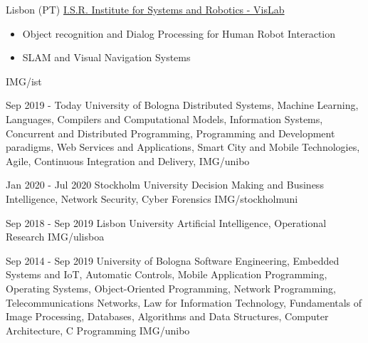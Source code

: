 \documentclass[paper=a4,fontsize=11pt, hidelinks]{temp} %
\begin{document}
{Lisbon (PT) \href{https://welcome.isr.tecnico.ulisboa.pt/}{ I.S.R. Institute for Systems and Robotics - VisLab}}
{
 \begin{itemize}
    \item Object recognition and Dialog Processing for Human Robot Interaction
    \item SLAM and Visual Navigation Systems
 \end{itemize}
} {IMG/ist}

\noindent

{Sep 2019 - Today}
{University of Bologna}
{Distributed Systems, Machine Learning,    Languages, Compilers and Computational Models,    Information Systems,     Concurrent and Distributed Programming,    Programming and Development paradigms,    Web Services and Applications,     Smart City and Mobile Technologies,     Agile, Continuous Integration and Delivery,  } 
{IMG/unibo}


\sepspace

{Jan 2020 - Jul 2020}
{Stockholm University}
{Decision Making and Business Intelligence, Network Security, Cyber Forensics}
{IMG/stockholmuni}

\sepspace

{Sep 2018 - Sep 2019}
{Lisbon University}
{Artificial Intelligence, Operational Research} 
{IMG/ulisboa}

\sepspace

{Sep 2014 - Sep 2019}
{University of Bologna }
{Software Engineering, Embedded Systems and IoT, Automatic Controls, Mobile Application Programming, Operating Systems, Object-Oriented Programming, Network Programming, Telecommunications Networks, Law for Information Technology, Fundamentals of Image Processing, Databases, Algorithms and Data Structures, Computer Architecture, C Programming} 
{IMG/unibo}
\end{document}
